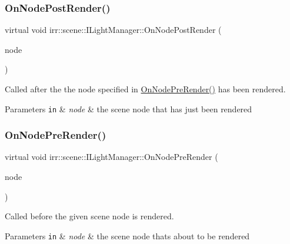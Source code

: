 \subsubsection{\texorpdfstring{On\+Node\+Post\+Render()}{OnNodePostRender()}}
{\footnotesize\ttfamily virtual void irr\+::scene\+::\+I\+Light\+Manager\+::\+On\+Node\+Post\+Render (\begin{DoxyParamCaption}\item[{\hyperlink{classirr_1_1scene_1_1ISceneNode}{I\+Scene\+Node} $\ast$}]{node }\end{DoxyParamCaption})\hspace{0.3cm}{\ttfamily [pure virtual]}}



Called after the the node specified in \hyperlink{classirr_1_1scene_1_1ILightManager_a23ae7bdf54613e6dd41d4138cb6f5edc}{On\+Node\+Pre\+Render()} has been rendered. 


\begin{DoxyParams}[1]{Parameters}
\mbox{\tt in}  & {\em node} & the scene node that has just been rendered \\
\hline
\end{DoxyParams}
\mbox{\label{classirr_1_1scene_1_1ILightManager_a23ae7bdf54613e6dd41d4138cb6f5edc}} 
\subsubsection{\texorpdfstring{On\+Node\+Pre\+Render()}{OnNodePreRender()}}
{\footnotesize\ttfamily virtual void irr\+::scene\+::\+I\+Light\+Manager\+::\+On\+Node\+Pre\+Render (\begin{DoxyParamCaption}\item[{\hyperlink{classirr_1_1scene_1_1ISceneNode}{I\+Scene\+Node} $\ast$}]{node }\end{DoxyParamCaption})\hspace{0.3cm}{\ttfamily [pure virtual]}}



Called before the given scene node is rendered. 


\begin{DoxyParams}[1]{Parameters}
\mbox{\tt in}  & {\em node} & the scene node that\textquotesingle{}s about to be rendered \\
\hline
\end{DoxyParams}
\mbox{\label{classirr_1_1scene_1_1ILightManager_ac8f92f0fbd43ba9cb01b47647125a1a3}} 
